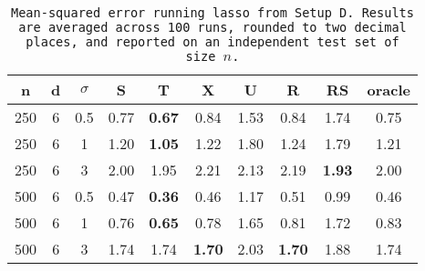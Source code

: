 \begin{table}[ht]
\centering
\begin{tabular}{cccccccccc}
  \hline
n & d & $\sigma$ & S & T & X & U & R & RS & oracle \\ 
  \hline
250 & 6 & 0.5 & 0.77 & \bf 0.67 & 0.84 & 1.53 & 0.84 & 1.74 & 0.75 \\ 
  250 & 6 & 1 & 1.20 & \bf 1.05 & 1.22 & 1.80 & 1.24 & 1.79 & 1.21 \\ 
  250 & 6 & 3 & 2.00 & 1.95 & 2.21 & 2.13 & 2.19 & \bf 1.93 & 2.00 \\ 
  500 & 6 & 0.5 & 0.47 & \bf 0.36 & 0.46 & 1.17 & 0.51 & 0.99 & 0.46 \\ 
  500 & 6 & 1 & 0.76 & \bf 0.65 & 0.78 & 1.65 & 0.81 & 1.72 & 0.83 \\ 
  500 & 6 & 3 & 1.74 & 1.74 & \bf 1.70 & 2.03 & \bf 1.70 & 1.88 & 1.74 \\ 
   \hline
\end{tabular}
\caption{\tt Mean-squared error running \texttt{lasso} from Setup D. Results are averaged across 100 runs, rounded to two decimal places, and reported on an independent test set of size $n$.} 
\label{table:setup4}
\end{table}
